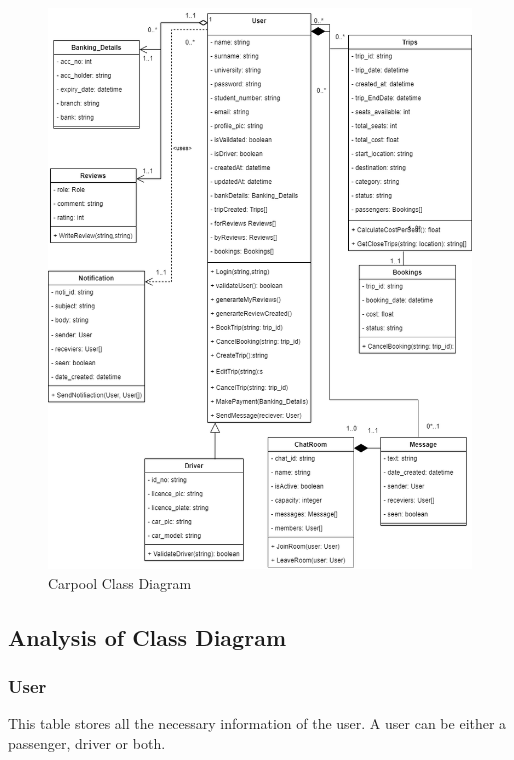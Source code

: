 \documentclass[hidelinks, 12pt, a4paper]{article}
\begin{document}
        \begin{figure}[H]
        
            \centering
            \includegraphics[scale=0.45]{images/Carpool_Class_Diagram.drawio.png}
            \caption{Carpool Class Diagram}
            \label{fig:ClassDiagram}
            
        \end{figure}
   \newpage     
        \subsection{Analysis of Class Diagram}
        
    \subsubsection{User}
        This table stores all the necessary information of the user. A user can be either a passenger, driver or both.
\end{document}
